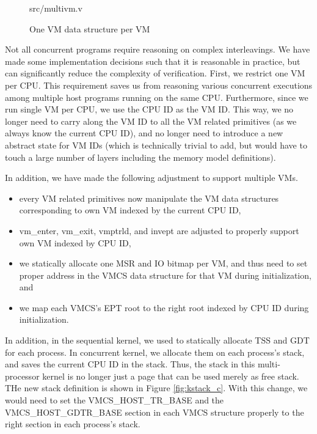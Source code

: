 \begin{figure}
	 {src/multivm.v}
	\caption{One VM data structure per VM}
	\label{fig:multivm_v}
\end{figure}

Not all concurrent programs require reasoning on complex interleavings. We have made
some implementation decisions such that it is reasonable in practice, but can significantly
reduce the complexity of verification. First, we restrict one VM per CPU. This requirement
saves us from reasoning various concurrent executions among multiple host programs running
on the same CPU. Furthermore, since we run single VM per CPU, we use the CPU ID as the VM ID.
This way, we no longer need to carry along the VM ID to all the VM related primitives (as we always
know the current CPU ID), and no longer need to introduce a new abstract state for VM IDs (which
is technically trivial to add, but would have to touch a large number of layers including the memory
model definitions).

In addition, we have made the following adjustment to support multiple VMs.

\begin{itemize}
\item every VM related primitives now manipulate the VM data structures corresponding to own
VM indexed by the current CPU ID,
\item \textsf{vm\_enter}, \textsf{vm\_exit}, \textsf{vmptrld}, and \textsf{invept} are adjusted
to properly support own VM indexed by CPU ID, 
\item we statically allocate one MSR and IO bitmap per VM, and thus need to set proper address in the
VMCS data structure for that VM during initialization, and
\item we map each VMCS's EPT root to the right root indexed by CPU ID during initialization.
\end{itemize}

In addition, in the sequential kernel, we used to statically allocate TSS and GDT for each process.
In concurrent kernel, we allocate them on each process's stack, and saves the current CPU ID in the stack.
Thus, the stack in this multi-processor kernel is no longer just a page that can be used merely as free stack.
THe new stack definition is shown in Figure \ref{fig:kstack_c}. 
With this change, we would need to set the \textsf{VMCS\_HOST\_TR\_BASE} and the
\textsf{VMCS\_HOST\_GDTR\_BASE} section in each VMCS structure properly to the right section 
in each process's stack.

